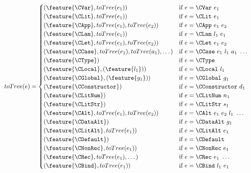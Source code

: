   \begin{align*}\label{fig:totree}
    toTree(e) &=
    \begin{cases}
      (\feature{\CVar},     toTree(e_1))                                 & \text{if $e = \CVar\ e_1$} \\
      (\feature{\CLit},     toTree(e_1))                                 & \text{if $e = \CLit\ e_1$} \\
      (\feature{\CApp},     toTree(e_1), toTree(e_2))                    & \text{if $e = \CApp\ e_1\ e_2$} \\
      (\feature{\CLam},     toTree(e_1))                                 & \text{if $e = \CLam\ l_1\ e_1$} \\
      (\feature{\CLet},     toTree(e_1), toTree(e_2))                    & \text{if $e = \CLet\ e_1\ e_2$} \\
      (\feature{\CCase},    toTree(e_1), toTree(a_1), \dots)             & \text{if $e = \CCase\ e_1\ l_1\ a_1\ \dots$} \\
      (\feature{\CType})                                                & \text{if $e = \CType$} \\
      (\feature{\CLocal},   (\feature{l_1}))                            & \text{if $e = \CLocal\ l_1$} \\
      (\feature{\CGlobal},  (\feature{g_1}))                            & \text{if $e = \CGlobal\ g_1$} \\
      (\feature{\CConstructor})                                         & \text{if $e = \CConstructor\ d_1$} \\
      (\feature{\CLitNum})                                              & \text{if $e = \CLitNum\ n_1$} \\
      (\feature{\CLitStr})                                              & \text{if $e = \CLitStr\ s_1$} \\
      (\feature{\CAlt},     toTree(e_1), toTree(e_2))                   & \text{if $e = \CAlt\ e_1\ e_2\ l_1\ \dots$}  \\
      (\feature{\CDataAlt})                                             & \text{if $e = \CDataAlt\ g_1$}  \\
      (\feature{\CLitAlt},  toTree(e_1))                                & \text{if $e = \CLitAlt\ e_1$}  \\
      (\feature{\CDefault})                                             & \text{if $e = \CDefault$}  \\
      (\feature{\CNonRec},  toTree(e_1))                                & \text{if $e = \CNonRec\ e_1$}  \\
      (\feature{\CRec},     toTree(e_1), \dots)                         & \text{if $e = \CRec\ e_1\ \dots$} \\
      (\feature{\CBind},    toTree(e_1))                                & \text{if $e = \CBind\ l_1\ e_1$}
    \end{cases}
  \end{align*}

